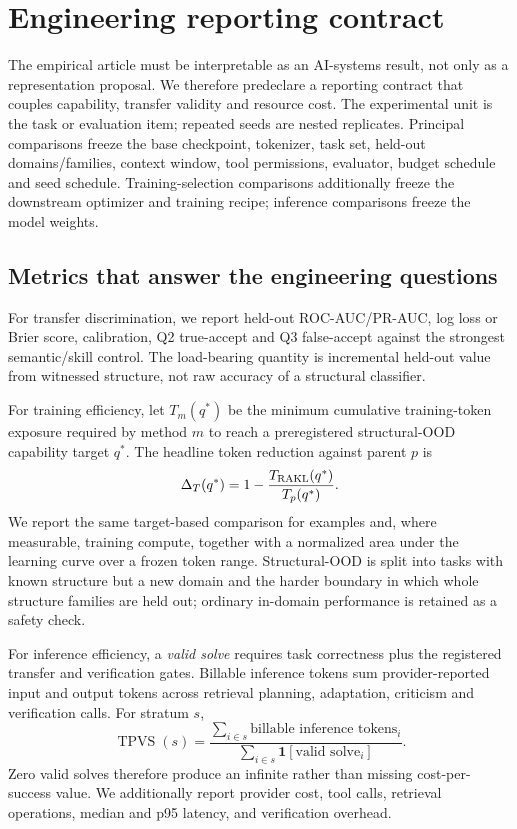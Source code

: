 \section{Engineering reporting contract}

The empirical article must be interpretable as an AI-systems result, not only as a representation proposal. We therefore predeclare a reporting contract that couples capability, transfer validity and resource cost. The experimental unit is the task or evaluation item; repeated seeds are nested replicates. Principal comparisons freeze the base checkpoint, tokenizer, task set, held-out domains/families, context window, tool permissions, evaluator, budget schedule and seed schedule. Training-selection comparisons additionally freeze the downstream optimizer and training recipe; inference comparisons freeze the model weights.

\subsection{Metrics that answer the engineering questions}

For transfer discrimination, we report held-out ROC-AUC/PR-AUC, log loss or Brier score, calibration, Q2 true-accept and Q3 false-accept against the strongest semantic/skill control. The load-bearing quantity is incremental held-out value from witnessed structure, not raw accuracy of a structural classifier.

For training efficiency, let $T_m(q^*)$ be the minimum cumulative training-token exposure required by method $m$ to reach a preregistered structural-OOD capability target $q^*$. The headline token reduction against parent $p$ is
\[
\Delta_T(q^*)=1-\frac{T_{\rm RAKL}(q^*)}{T_p(q^*)}.
\]
We report the same target-based comparison for examples and, where measurable, training compute, together with a normalized area under the learning curve over a frozen token range. Structural-OOD is split into tasks with known structure but a new domain and the harder boundary in which whole structure families are held out; ordinary in-domain performance is retained as a safety check.

For inference efficiency, a \emph{valid solve} requires task correctness plus the registered transfer and verification gates. Billable inference tokens sum provider-reported input and output tokens across retrieval planning, adaptation, criticism and verification calls. For stratum $s$,
\[
\operatorname{TPVS}(s)=
\frac{\sum_{i\in s}\text{billable inference tokens}_i}
{\sum_{i\in s}\mathbf 1[\text{valid solve}_i]}.
\]
Zero valid solves therefore produce an infinite rather than missing cost-per-success value. We additionally report provider cost, tool calls, retrieval operations, median and p95 latency, and verification overhead.


